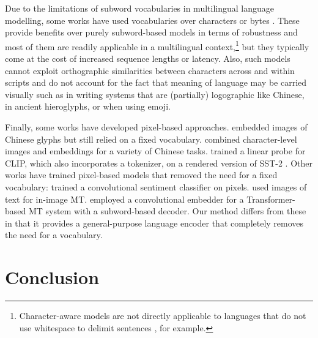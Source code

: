 \documentclass{article}
\begin{document}
Due to the limitations of subword vocabularies in multilingual language modelling, some works have used vocabularies over characters \citep[][\emph{inter alia}]{lee-etal-2017-fully, ma-etal-2020-charbert} or bytes \citep{DBLP:conf/aaai/WangCG20, DBLP:journals/corr/abs-2101-09469}. These provide benefits over purely subword-based models in terms of robustness and most of them are readily applicable in a multilingual context,\footnote{Character-aware models are not directly applicable to languages that do not use whitespace to delimit sentences \citep{tay2021charformer}, for example.} but they typically come at the cost of increased sequence lengths or latency. Also, such models cannot exploit orthographic similarities between characters across and within scripts and do not account for the fact that meaning of language may be carried visually such as in writing systems that are (partially) logographic like Chinese, in ancient hieroglyphs, or when using emoji.

Finally, some works have developed pixel-based approaches. \cite{broscheit-2018-learning} embedded images of Chinese glyphs but still relied on a fixed vocabulary. 
\cite{Wu2019GlyceGF} combined character-level images and embeddings for a variety of Chinese tasks. 
\cite{DBLP:conf/icml/RadfordKHRGASAM21} trained a linear probe for CLIP, which also incorporates a tokenizer,
on a rendered version of SST-2 \citep{socher-etal-2013-recursive}. Other works have trained pixel-based models that removed the need for a fixed vocabulary: 
\cite{Sun2019SquaredEW} trained a convolutional sentiment classifier on pixels. 
\cite{mansimov-etal-2020-towards} used images of text for in-image MT. 
\cite{salesky-etal-2021-robust} employed a convolutional embedder for a Transformer-based MT system with a subword-based decoder. Our method differs from these in that it provides a general-purpose language encoder that completely removes the need for a vocabulary.

\vspace{-2mm}
\section{Conclusion}
\vspace{-2mm}
\end{document}
